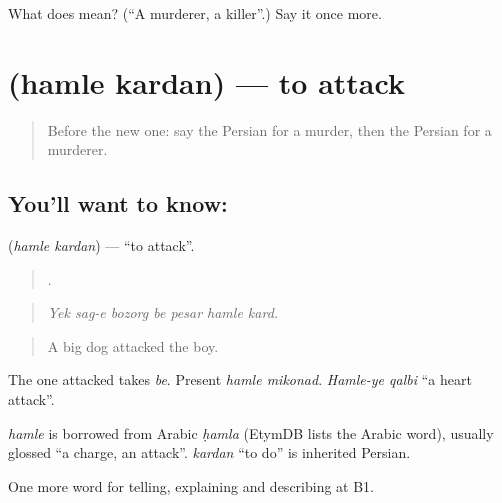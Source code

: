 \begin{tcolorbox}[breakable,colback=teal!4,colframe=teal!35!black,title={Before you move on}]
What does  mean? (\textquotedblleft{}A murderer, a killer\textquotedblright{}.) Say it once more.
\end{tcolorbox}
\section[\texorpdfstring{\fa{حمله} \fa{کردن} (hamle kardan)}{حمله کردن (hamle kardan)}]{  (hamle kardan) — to attack}

\label{lesson:FA-C318-hamle-kardan}



\begin{quote}
Before the new one: say the Persian for a murder, then the Persian for a murderer.
\end{quote}

\subsection*{You'll want to know:  }
\textbf{ } (\emph{hamle kardan}) — \textquotedblleft{}to attack\textquotedblright{}.

\begin{quote}
      .
\end{quote}

\begin{quote}
\emph{Yek sag-e bozorg be pesar hamle kard.}
\end{quote}

\begin{quote}
A big dog attacked the boy.
\end{quote}

The one attacked takes \emph{be}. Present \emph{hamle mikonad}. \emph{Hamle-ye qalbi} \textquotedblleft{}a heart attack\textquotedblright{}.

\begin{cousinweb}
\emph{hamle} is borrowed from Arabic \emph{ḥamla} (EtymDB lists the Arabic word), usually glossed \textquotedblleft{}a charge, an attack\textquotedblright{}. \emph{kardan} \textquotedblleft{}to do\textquotedblright{} is inherited Persian.
\end{cousinweb}

\begin{grammarlens}[title={What you've built}]
One more word for telling, explaining and describing at B1.
\end{grammarlens}

